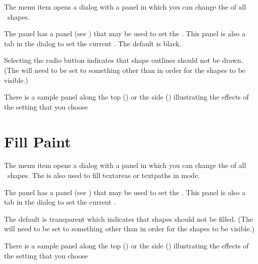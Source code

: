 
The  menu item opens a dialog
with a  panel in which
you can change the  
of all \selected\ \glspl{shape}.


The  panel has a  panel
(see ) that may be used to set the 
. This panel is also a tab
in the  dialog to set the current
.
The default  is black.

Selecting the  radio button indicates
that \gls{shape} outlines should not be drawn.  (The 
will need to be set to something other than
 in order for the \glspl{shape} to be
visible.)

There is a sample panel along the top ()
or the side () illustrating the
effects of the  setting that you choose

\section{Fill Paint}\label{sec:fillpaint}


The  menu item opens a dialog with a
 panel in which you can change the
 of all \selected\
\glspl{shape}. The  is also used to fill
\glspl{textarea} or \glspl{textpath} in  mode. 


The  panel has a  panel (see
\sectionref{sec:paint}) that may be used to set the
. This panel is also a tab in the
 dialog to set the current .

The default  is \gls{transparent} which indicates
that \glspl{shape} should not be filled.  (The \pathattr{line-paint}
will need to be set to something other than
 in order for the \glspl{shape} to be
visible.)

There is a sample panel along the top ()
or the side () illustrating the
effects of the  setting that you choose

